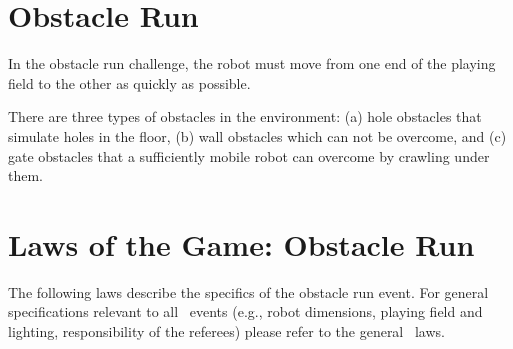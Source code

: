 \documentclass[12pt]{hurocup}
\begin{document}
\newpage

\section{Obstacle Run}
\label{subsec:obstacle-run} 

In the obstacle run challenge, the robot must move from one end of the
playing field to the other as quickly as possible.

There are three types of obstacles in the environment: (a) hole
obstacles that simulate holes in the floor, (b) wall obstacles which
can not be overcome, and (c) gate obstacles that a sufficiently mobile
robot can overcome by crawling under them.

\section{Laws of the Game: Obstacle Run}
\label{sec:laws-obstacle-run}

The following laws describe the specifics of the obstacle run
event. For general specifications relevant to all \HuroCup\ events
(e.g., robot dimensions, playing field and lighting, responsibility of
the referees) please refer to the general \HuroCup\ laws.

\label{law:or-field}
\end{document}
